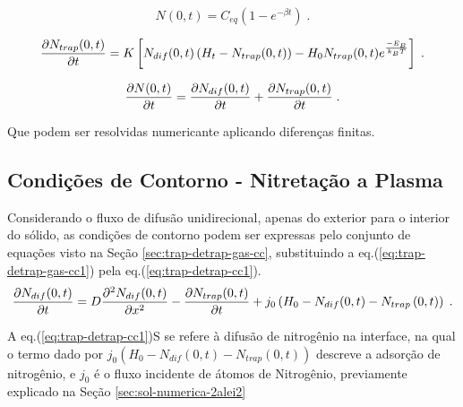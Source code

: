 \begin{equation}
\label{eq:trap-detrap-gas-cc1}
N(0,t) = C_{eq}(1 - e^{-\beta t}) \;.
\end{equation}

\begin{equation}
\label{eq:trap-detrap-gas-cc2}
\pdv{N_{trap}(0,t)}{t} = K\left[N_{dif}(0,t)\left(H_t-N_{trap}(0,t)\right) - H_0 N_{trap}(0,t)e^{\frac{-E_B}{k_BT}}\right]  \;.
\end{equation}

\begin{equation}
\label{eq:trap-detrap-gas-cc3}
\pdv{N(0,t)}{t} = \pdv{N_{dif}(0,t)}{t} + \pdv{N_{trap}(0,t)}{t} \;.
\end{equation}

Que podem ser resolvidas numericante aplicando diferenças finitas.

\subsection{Condições de Contorno - Nitretação a Plasma}
\label{sec:trap-detrap-plasma-cc}
Considerando o fluxo de difusão unidirecional, apenas do exterior para o interior do sólido, as condições de contorno podem ser expressas pelo conjunto de equações visto na Seção \ref{sec:trap-detrap-gas-cc}, substituindo a eq.(\ref{eq:trap-detrap-gas-cc1}) pela eq.(\ref{eq:trap-detrap-cc1}).
\begin{equation}
\label{eq:trap-detrap-cc1}
\pdv{N_{dif}(0,t)}{t} = D\pdv[2]{N_{dif}(0,t)}{x} - \pdv{N_{trap}(0,t)}{t}  + j_{0}\left(H_0-N_{dif}(0,t)-N_{trap}\left(0,t\right)\right) \;.
\end{equation}


A eq.(\ref{eq:trap-detrap-cc1})S se refere à difusão de nitrogênio na interface, na qual o termo dado por $j_{0}\left(H_0-N_{dif}(0,t)-N_{trap}\left(0,t\right)\right)$ descreve a adsorção de nitrogênio, e  $j_0$ é o fluxo incidente de átomos de Nitrogênio, previamente explicado na Seção \autoref{sec:sol-numerica-2alei2}

